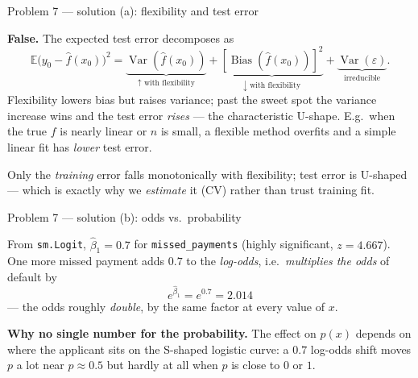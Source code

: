 \documentclass[aspectratio=169,11pt]{beamer}
\begin{document}
\begin{frame}{Problem 7 --- solution (a): flexibility and test error}
  \begin{solutionbox}
    \textbf{False.} The expected test error decomposes as
    \[
      \mathbb{E}\bigl(y_0-\hat f(x_0)\bigr)^2
      =\underbrace{\operatorname{Var}(\hat f(x_0))}_{\uparrow\text{ with flexibility}}
      +\underbrace{[\operatorname{Bias}(\hat f(x_0))]^2}_{\downarrow\text{ with flexibility}}
      +\underbrace{\operatorname{Var}(\varepsilon)}_{\text{irreducible}} .
    \]
    Flexibility lowers bias but raises variance; past the sweet spot the variance increase wins and
    the test error \emph{rises} --- the characteristic U-shape. E.g.\ when the true $f$ is nearly
    linear or $n$ is small, a flexible method overfits and a simple linear fit has \emph{lower}
    test error.
  \end{solutionbox}
  \begin{takeaway}
    \footnotesize Only the \emph{training} error falls monotonically with flexibility; test error
    is U-shaped --- which is exactly why we \emph{estimate} it (CV) rather than trust training fit.
  \end{takeaway}
\end{frame}

\begin{frame}{Problem 7 --- solution (b): odds vs.\ probability}
  \begin{solutionbox}
    From \texttt{sm.Logit}, $\hat\beta_1=0.7$ for \texttt{missed\_payments} (highly significant,
    $z=4.667$). One more missed payment adds $0.7$ to the \emph{log-odds}, i.e.\ \emph{multiplies
    the odds} of default by
    \[
      e^{\hat\beta_1}=e^{0.7}=\mathbf{2.014}
    \]
    --- the odds roughly \emph{double}, by the same factor at every value of $x$.
    \medskip

    \textbf{Why no single number for the probability.} The effect on $p(x)$ depends on where the
    applicant sits on the S-shaped logistic curve: a $0.7$ log-odds shift moves $p$ a lot near
    $p\approx0.5$ but hardly at all when $p$ is close to $0$ or $1$.
  \end{solutionbox}
\end{frame}
\end{document}
